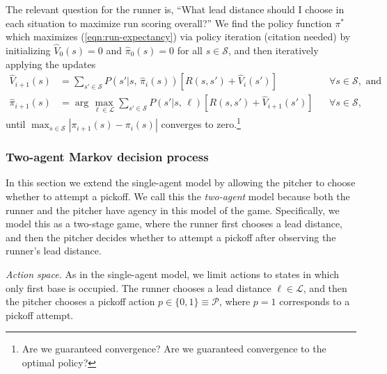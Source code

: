 \documentclass{article}
\begin{document}
        The relevant question for the runner is, ``What lead distance should I choose in each situation to maximize run scoring overall?'' We find the policy function $\pi^*$ which maximizes (\ref{eqn:run-expectancy}) via policy iteration (citation needed) by initializing $\hat V_0(s) = 0$ and $\hat \pi_0(s) = 0$ for all $s \in \mathcal{S}$, and then iteratively applying the updates
        \begin{align}
          \label{eqn:update-value-single-agent}
          \hat V_{i+1}(s) &= \sum_{s' \in \mathcal{S}} P(s' | s,\, \hat\pi_i(s)) [R(s, s') + \hat V_i(s')] && \forall s \in \mathcal{S}, \mbox{ and}\\
          \label{eqn:update-policy-single-agent}
          \hat\pi_{i+1}(s) &= \arg\max_{\ell \in \mathcal{L}} \sum_{s' \in \mathcal{S}} P(s' | s,\, \ell) [R(s, s') + \hat V_{i+1}(s')] && \forall s \in \mathcal{S},
        \end{align}
        until $\max_{s\in\mathcal{S}}|\pi_{i+1}(s) - \pi_i(s)|$ converges to zero.\footnote{Are we guaranteed convergence? Are we guaranteed convergence to the optimal policy?}
    
      \subsubsection{Two-agent Markov decision process}
      \label{sec:two-agent-mdp}

        In this section we extend the single-agent model by allowing the pitcher to choose whether to attempt a pickoff. We call this the {\it two-agent} model because both the runner and the pitcher have agency in this model of the game. Specifically, we model this as a two-stage game, where the runner first chooses a lead distance, and then the pitcher decides whether to attempt a pickoff after observing the runner's lead distance.

        {\it Action space.} As in the single-agent model, we limit actions to states in which only first base is occupied. The runner chooses a lead distance $\ell \in \mathcal{L}$, and then the pitcher chooses a pickoff action $p \in \{0, 1\} \equiv \mathcal{P}$, where $p = 1$ corresponds to a pickoff attempt.
\end{document}
